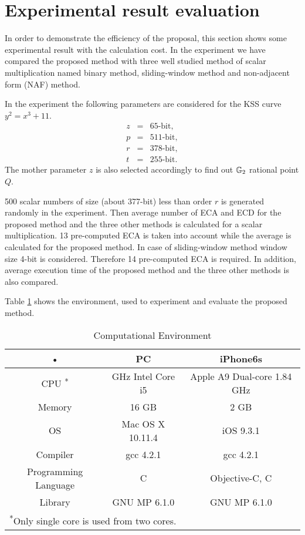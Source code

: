 \section{Experimental result evaluation}
In order to demonstrate the efficiency of the proposal, this section shows some experimental result with the calculation cost. In the experiment we have compared the proposed method with three well studied method of scalar multiplication named binary method, sliding-window method and non-adjacent form (NAF) method.

In the experiment the following parameters are considered for the KSS curve $y^2 = x^3 + 11$. 
\begin{eqnarray}
z & = & 65   \mbox{-bit},  \nonumber \\ 
p  & = & 511 \mbox{-bit},  \nonumber \\ 
r  & = & 378 \mbox{-bit} ,\nonumber \\ 
t  & = & 255  \mbox{-bit}. \nonumber
\end{eqnarray}
The mother parameter $z$ is also selected accordingly to find out ${\mathbb{G}}_{2}$ rational point $Q$. 

500 scalar numbers of size (about 377-bit) less than order $r$ is generated randomly in the experiment. Then average number of ECA and ECD for the proposed method and the three other methods is calculated for a scalar multiplication. 13  pre-computed ECA is taken into account while the average is calculated for the proposed method. In case of sliding-window method window size 4-bit is considered. Therefore 14 pre-computed ECA is required. In addition, average execution time of the proposed method and the three other methods is also compared.

Table \ref{tab1} shows the environment, used to experiment and evaluate the proposed method.  
\renewcommand{\baselinestretch}{1.5}
\begin{table}[!ht]
\renewcommand{\arraystretch}{1.3}
\centering
\caption{ Computational Environment}
\label{tab1}
\begin{tabular}{|c|c|c|}
\hline 
• & PC & iPhone6s \\ 
\hline \hline 
CPU {\textsuperscript{*}} & \quad 2.7 GHz Intel Core i5 \quad & \quad Apple A9 Dual-core 1.84 GHz \quad \\ 
\hline 
Memory & 16 GB & 2 GB \\ 
\hline 
OS & Mac OS X 10.11.4 &  iOS 9.3.1 \\ 
\hline 
Compiler & gcc 4.2.1 & gcc 4.2.1 \\ 
\hline 
\quad Programming Language \quad  & C & Objective-C, C \\ 
\hline 
Library & GNU MP 6.1.0 & GNU MP 6.1.0 \\ 
\hline 
\midrule[.5pt]
\multicolumn{3}{l}{\textsuperscript{*}\footnotesize{Only single core is used from two cores.}}\\
\end{tabular} 
\end{table}
\renewcommand{\baselinestretch}{1.0}

